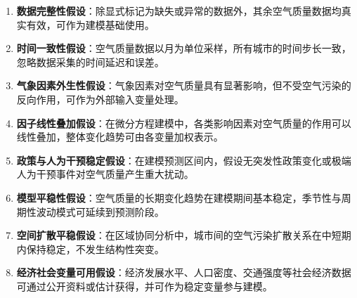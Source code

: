 \documentclass[a4paper,12pt]{article}
\begin{document}
	\begin{enumerate}
		\item \textbf{数据完整性假设}：除显式标记为缺失或异常的数据外，其余空气质量数据均真实有效，可作为建模基础使用。
		
		\item \textbf{时间一致性假设}：空气质量数据以月为单位采样，所有城市的时间步长一致，忽略数据采集的时间延迟和误差。
		
		\item \textbf{气象因素外生性假设}：气象因素对空气质量具有显著影响，但不受空气污染的反向作用，可作为外部输入变量处理。
		
		\item \textbf{因子线性叠加假设}：在微分方程建模中，各类影响因素对空气质量的作用可以线性叠加，整体变化趋势可由各变量加权表示。
		
		\item \textbf{政策与人为干预稳定假设}：在建模预测区间内，假设无突发性政策变化或极端人为干预事件对空气质量产生重大扰动。
		
		\item \textbf{模型平稳性假设}：空气质量的长期变化趋势在建模期间基本稳定，季节性与周期性波动模式可延续到预测阶段。
		
		\item \textbf{空间扩散平稳假设}：在区域协同分析中，城市间的空气污染扩散关系在中短期内保持稳定，不发生结构性突变。
		
		\item \textbf{经济社会变量可用假设}：经济发展水平、人口密度、交通强度等社会经济数据可通过公开资料或估计获得，并可作为稳定变量参与建模。
	\end{enumerate}
	
	
\end{document}
